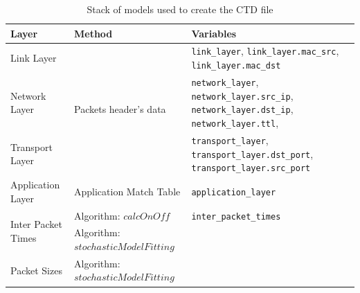 \begin{table}[ht!]
	\centering
	\caption{Stack of models used to create the CTD file}
	\label{tab:mehtods}
	\begin{tabular}{|l|l|l|}
		\hline
		Layer & Method & Variables \\
		\hline
		Link Layer  & \multirow{3}{*}{Packets header's data} & \texttt{link\_layer}, \texttt{link\_layer.mac\_src}, \texttt{link\_layer.mac\_dst} \\ \cline{1-1}\cline{3-3}
		
		Network Layer & & \texttt{network\_layer}, \texttt{network\_layer.src\_ip}, \texttt{network\_layer.dst\_ip}, \texttt{network\_layer.ttl},\texttt{}\\ \cline{1-1}\cline{3-3}
		
		Transport Layer & & \texttt{transport\_layer}, \texttt{transport\_layer.dst\_port}, \texttt{transport\_layer.src\_port}\\ \hline
		
		Application Layer  & Application Match Table  & \texttt{application\_layer} \\ \hline
		
		\multirow{2}{*}{Inter Packet Times} & Algorithm: $calcOnOff$  & \texttt{inter\_packet\_times}\\ 
		\cline{2-2}\cline{3-3}  & Algorithm: $stochasticModelFitting$                    &\\  \hline
		Packet Sizes  & Algorithm: $stochasticModelFitting$ &\\ \hline
	\end{tabular}
\end{table}






